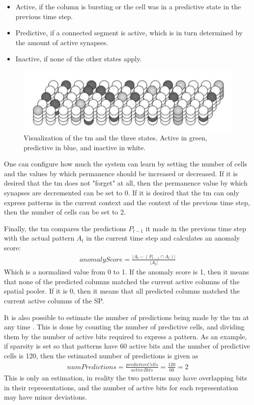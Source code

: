 \begin{itemize}
    \item Active, if the column is bursting or the cell was in a predictive state in the previous time step.
    \item Predictive, if a connected segment is active, which is in turn determined by the amount of active synapses.
    \item Inactive, if none of the other states apply.
\end{itemize}
\begin{figure}[H]
    \centering
    \includegraphics[width=\linewidth]{resources/related_works/tm_vis_alt}
    \caption{Visualization of the \gls*{tm} and the three states. Active in green, predictive in blue, and inactive in white.}
\end{figure}

One can configure how much the system can learn by setting the number of cells and the values by which permanence should be increased or decreased. If it is desired that the \gls*{tm} does not "forget" at all, then the permanence value by which synapses are decremented can be set to 0. If it is desired that the \gls*{tm} can only express patterns in the current context and the context of the previous time step, then the number of cells can be set to 2.
\par
Finally, the \gls*{tm} compares the predictions $P_{t-1}$ it made in the previous time step with the actual pattern $A_t$ in the current time step and calculates an anomaly score:
\begin{align*}
    anomalyScore=\frac{|A_t-(P_{t-1}\cap A_t)|}{|A_t|}
\end{align*}
Which is a normalized value from 0 to 1. If the anomaly score is 1, then it means that none of the predicted columns matched the current active columns of the spatial pooler. If it is 0, then it means that all predicted columns matched the current active columns of the SP.\par
It is also possible to estimate the number of predictions being made by the \gls*{tm} at any time \cite{htm_predictions_count}. This is done by counting the number of predictive cells, and dividing them by the number of active bits required to express a pattern. As an example, if sparsity is set so that patterns have 60 active bits and the number of predictive cells is 120, then the estimated number of predictions is given as
\begin{align*}
    numPredictions=\frac{predictiveCells}{activeBits}=\frac{120}{60}=2
\end{align*}
This is only an estimation, in reality the two patterns may have overlapping bits in their representations, and the number of active bits for each representation may have minor deviations.
